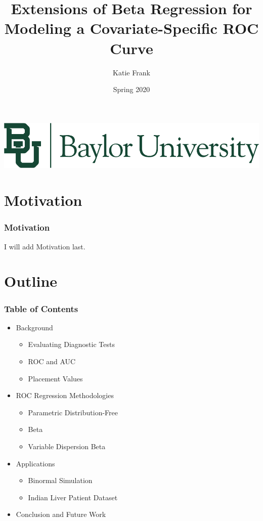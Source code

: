 \documentclass[t]{beamer}
\title[Baylor Theme]{Extensions of Beta Regression for Modeling a Covariate-Specific ROC Curve}
\author[Frank]{Katie Frank} %
\date{Spring 2020}
\begin{document}
\begin{frame}
  \titlepage
  \begin{center}
    \includegraphics[scale=0.6]{BU_BrandMark_Horz_Green}
  \end{center}
\end{frame}

\section{Motivation}

\begin{frame}
\frametitle{Motivation}
I will add Motivation last.
\end{frame}

\section{Outline}

\begin{frame}[allowframebreaks]
\frametitle{Table of Contents}
\begin{itemize}
    \item Background
    \begin{itemize}
        \item Evaluating Diagnostic Tests
        \item ROC and AUC
        \item Placement Values
    \end{itemize}
    \item ROC Regression Methodologies
    \begin{itemize}
        \item Parametric Distribution-Free
        \item Beta 
        \item Variable Dispersion Beta
    \end{itemize}
    \item Applications
    \begin{itemize}
        \item Binormal Simulation
        \item Indian Liver Patient Dataset
    \end{itemize}
    \item Conclusion and Future Work
\end{itemize}

\end{frame}
\end{document}
